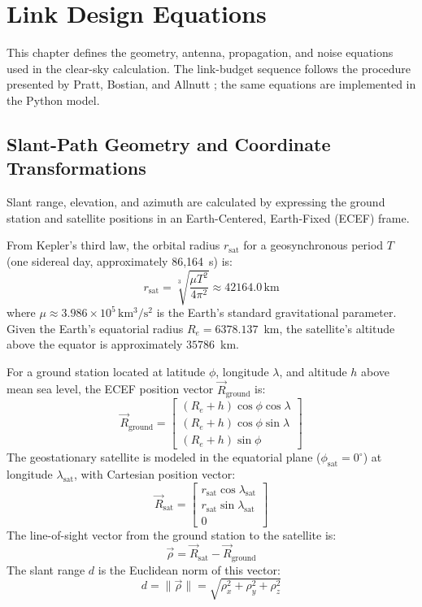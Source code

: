 
\section{Link Design Equations}

This chapter defines the geometry, antenna, propagation, and noise equations used in the clear-sky calculation. The link-budget sequence follows the procedure presented by Pratt, Bostian, and Allnutt \cite{pratt}; the same equations are implemented in the Python model.

\subsection{Slant-Path Geometry and Coordinate Transformations}
Slant range, elevation, and azimuth are calculated by expressing the ground station and satellite positions in an Earth-Centered, Earth-Fixed (ECEF) frame.

From Kepler's third law, the orbital radius $r_{\mathrm{sat}}$ for a geosynchronous period $T$ (one sidereal day, approximately 86,164~s) is:
\begin{equation}
    r_{\mathrm{sat}}
    =
    \sqrt[3]{\frac{\mu T^2}{4\pi^2}}
    \approx 42164.0\,\mathrm{km}
\end{equation}
where $\mu \approx 3.986 \times 10^5\,\mathrm{km^3/s^2}$ is the Earth's standard gravitational parameter. Given the Earth's equatorial radius $R_e = 6378.137$~km, the satellite's altitude above the equator is approximately $35786$~km.

For a ground station located at latitude $\phi$, longitude $\lambda$, and altitude $h$ above mean sea level, the ECEF position vector $\vec{R}_{\mathrm{ground}}$ is:
\begin{equation}
    \vec{R}_{\mathrm{ground}} = \begin{bmatrix} (R_e + h)\cos\phi\cos\lambda \\ (R_e + h)\cos\phi\sin\lambda \\ (R_e + h)\sin\phi \end{bmatrix}
\end{equation}
The geostationary satellite is modeled in the equatorial plane ($\phi_{\mathrm{sat}} = 0^\circ$) at longitude $\lambda_{\mathrm{sat}}$, with Cartesian position vector:
\begin{equation}
    \vec{R}_{\mathrm{sat}} = \begin{bmatrix} r_{\mathrm{sat}}\cos\lambda_{\mathrm{sat}} \\ r_{\mathrm{sat}}\sin\lambda_{\mathrm{sat}} \\ 0 \end{bmatrix}
\end{equation}
The line-of-sight vector from the ground station to the satellite is:
\begin{equation}
    \vec{\rho} = \vec{R}_{\mathrm{sat}} - \vec{R}_{\mathrm{ground}}
\end{equation}
The slant range $d$ is the Euclidean norm of this vector:
\begin{equation}
    d = \|\vec{\rho}\| = \sqrt{\rho_x^2 + \rho_y^2 + \rho_z^2}
\end{equation}

